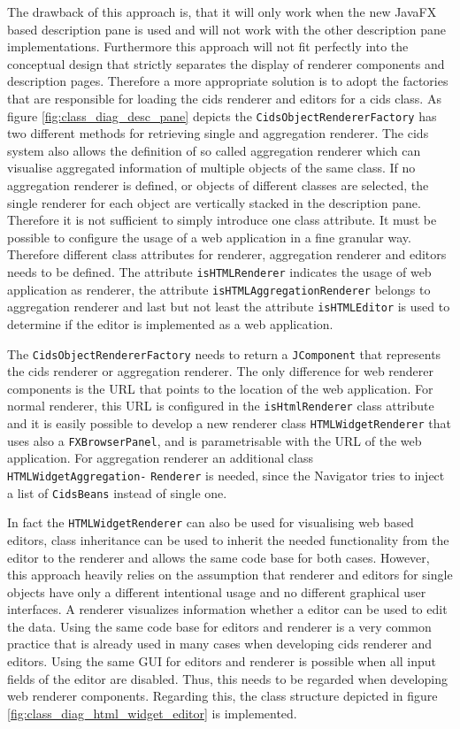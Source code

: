 The drawback of this approach is, that it will only work when the new JavaFX based description pane is used and will not work with the other description pane implementations.
Furthermore this approach will not fit perfectly into the conceptual design that strictly separates the display of renderer components and description pages.
Therefore a more appropriate solution is to adopt the factories that are responsible for loading the cids renderer and editors for a cids class.
As figure \ref{fig:class_diag_desc_pane} depicts the \texttt{CidsObjectRendererFactory} has two different methods for retrieving single and aggregation renderer.
The cids system also allows the definition of so called aggregation renderer which can visualise aggregated information of multiple objects of the same class.
If no aggregation renderer is defined, or objects of different classes are selected, the single renderer for each object are vertically stacked in the description pane.
Therefore it is not sufficient to simply introduce one class attribute. It must be possible to configure the usage of a web application in a fine granular way. 
Therefore different class attributes for renderer, aggregation renderer and editors needs to be defined. 
The attribute \texttt{isHTMLRenderer} indicates the usage of web application as renderer, the attribute \texttt{isHTMLAggregationRenderer} belongs to aggregation renderer and last but not least the attribute \texttt{isHTMLEditor} is used to determine if the editor is implemented as a web application.

The \texttt{CidsObjectRendererFactory} needs to return a \texttt{JComponent} that represents the cids renderer or aggregation renderer.
The only difference for web renderer components is the URL that  points to the location of the web application. For normal renderer, this URL is configured in the \texttt{isHtmlRenderer} class attribute and it is easily possible to develop a new renderer class \texttt{HTMLWidgetRenderer} that uses also a \texttt{FXBrowserPanel}, and is parametrisable  with the URL of the web application. For aggregation renderer an additional class \texttt{HTMLWidgetAggregation-} \texttt{Renderer} is needed, since
the Navigator tries to inject a list of \texttt{CidsBeans} instead of single one. 

In fact the \texttt{HTMLWidgetRenderer} can also be used for visualising web based editors, class inheritance can be used to inherit the needed functionality from the editor to the renderer and allows the same code base for both cases.
However, this approach heavily relies on the assumption that renderer and editors for single objects have only a different intentional usage and no different graphical user interfaces.
A renderer visualizes information whether a editor can be used to edit the data.
Using the same code base for editors and renderer is a very common practice that is  already used in many cases when developing cids renderer and editors.
Using the same GUI for editors and renderer is possible when all input fields of the editor are disabled.
Thus, this needs to be regarded when developing web renderer components.
Regarding this, the class structure depicted in figure  \ref{fig:class_diag_html_widget_editor} is implemented.

